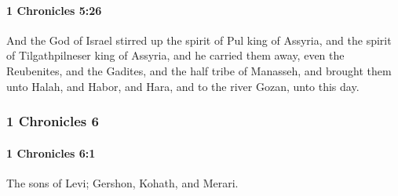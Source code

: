 		\paragraph{1 Chronicles 5:26} %
			\label{1CHRONICLES-5-26}

			And the God of Israel stirred up the spirit of Pul king of Assyria, and the spirit of Tilgathpilneser king of Assyria, and he carried them away, even the Reubenites, and the Gadites, and the half tribe of Manasseh, and brought them unto Halah, and Habor, and Hara, and to the river Gozan, unto this day.

	\subsubsection{1 Chronicles 6} %
		\label{1CHRONICLES-6}

		\paragraph{1 Chronicles 6:1} %
			\label{1CHRONICLES-6-1}

			The sons of Levi; Gershon, Kohath, and Merari.

